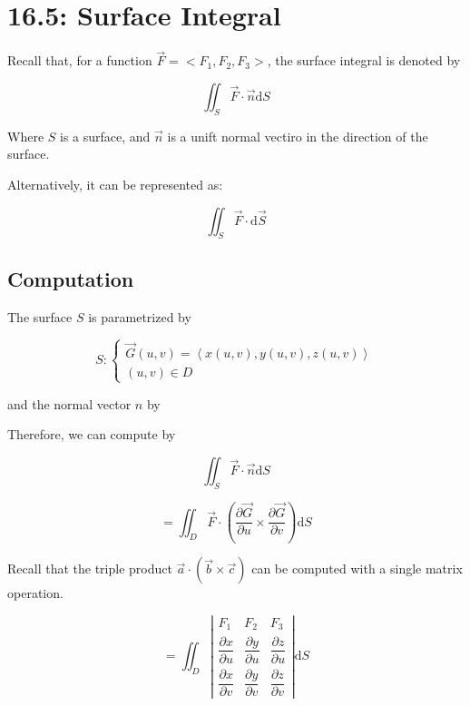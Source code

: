 \documentclass{article}
\newcommand{\norm}[1]{\left|\left|#1\right|\right|}
\newcommand{\D}[1]{\mathrm{d}#1}
\begin{document}
\section*{16.5: Surface Integral}

Recall that, for a function $\vec{F}=<F_1, F_2, F_3>$, the surface integral is denoted by

\[
\iint_S \vec{F}\cdot\vec{n} \D{S}
\]

Where $S$ is a surface, and $\vec{n}$ is a unift normal vectiro in the direction of the surface.

Alternatively, it can be represented as:

\[
\iint_S \vec{F}\cdot \D{\vec{S}}
\]

\subsection*{Computation}

The surface $S$ is parametrized by

\[
S: \begin{cases}
  \vec{G}(u,v) = \left<x(u,v), y(u,v), z(u,v)\right> \\
  (u, v) \in D
  \end{cases}
\]

and the normal vector $n$ by


Therefore, we can compute by

\[
\iint_S \vec{F} \cdot \vec{n} \D{S}
\]

\[
= \iint_D \vec{F} \cdot \left(\dfrac{\partial \vec{G}}{\partial u} \times \dfrac{\partial \vec{G}}{\partial v}\right) \D{S}
\]

Recall that the triple product $\vec{a} \cdot \left(\vec{b} \times \vec{c}\right)$ can be computed with a single matrix operation.

\[
= \iint_D \left| \begin{array}{ccc}
  F_1 & F_2 & F_3 \\
  \dfrac{\partial x}{\partial u} & \dfrac{\partial y}{\partial u} & \dfrac{\partial z}{\partial u} \\
  \dfrac{\partial x}{\partial v} & \dfrac{\partial y}{\partial v} & \dfrac{\partial z}{\partial v}
  \end{array} \right| \D{S}
\]
\end{document}
